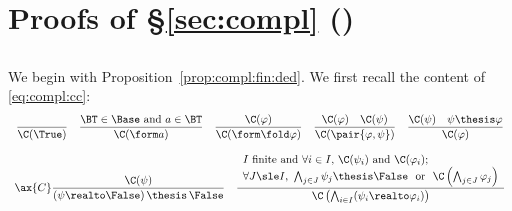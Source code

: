 \section{Proofs of \S\ref{sec:compl} ()}
\label{sec:proof:compl}


\subsection{}
\label{sec:proof:compl:fin}

We begin with Proposition~\ref{prop:compl:fin:ded}.
We first recall the content of \eqref{eq:compl:cc}:
\begin{equation}
\label{eq:proof:compl:cc}
\begin{array}{c}

\dfrac{}{\C(\True)}

\quad

\dfrac
  {\text{$\BT \in \Base$ and $a \in \BT$}}
  {\C(\form a)}

\quad

\dfrac{\C(\varphi)}
  {\C(\form\fold \varphi)}

\quad

\dfrac{\C(\varphi) 
  \quad
  \C(\psi)}
  {\C(\pair{\varphi,\psi})}

\quad

\dfrac{\C(\psi)
  \quad
  \psi \thesis \varphi}
  {\C(\varphi)}
\\\\

\ax{C}
\dfrac{\C(\psi)}
  {(\psi \realto \False) \,\thesis\, \False}

\quad

\dfrac{\begin{array}{l}
  \text{$I$ finite and $\forall i \in I$,}~
  \C(\psi_i) 
  ~\text{and}~
  \C(\varphi_i) ;
  \\
  \text{$\forall J \sle I$,}~
  \bigwedge_{j \in J} \psi_j \thesis \False
  ~~\text{or}~~
  \C\left( \bigwedge_{j \in J} \varphi_j \right)
  \end{array}}
  {\C\left( \bigwedge_{i \in I}(\psi_i \realto \varphi_i) \right)}
\end{array}
\end{equation}


